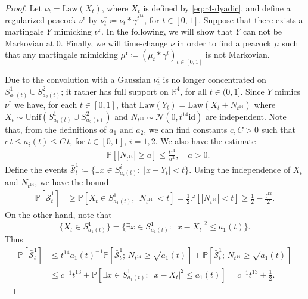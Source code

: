\documentclass[12pt,oneside]{amsart}
\theoremstyle{definition}
\newcommand{\Law}{\mathrm{Law}}
\newcommand{\id}{\mathrm{id}}
\newcommand{\R}{\mathbb R}
\newcommand{\Sccc}{\bar{\mathcal S}}
\newcommand{\reg}{\mathrm{r}}
\def\P{{\mathbb P}}
\def\R{{\mathbb R}}
\numberwithin{equation}{section}
\begin{document}
\begin{proof}
	Let $\nu_t = \Law(X_t)$, where $X_t$ is defined by \eqref{eq:r4-dyadic}, and define a regularized peacock $\nu^\reg$ by $\nu^\reg_t \coloneqq \nu_t \ast \gamma^{t^{14}}$, for $t \in [0, 1]$. Suppose that there exists a martingale $Y$ mimicking $\nu^\reg$. In the following, we will show that $Y$ can not be Markovian at $0$. Finally, we will time-change $\nu$ in order to find a peacock $\mu$ such that any martingale mimicking $\mu^\reg \coloneqq (\mu_t \ast \gamma^t)_{t \in [0, 1]}$ is not Markovian.

	Due to the convolution with a Gaussian $\nu^\reg_t$ is no longer concentrated on $S^1_{a_1(t)} \cup S^2_{a_2(t)}$; it rather has full support on $\R^4$, for all $t \in (0, 1]$. 
    Since $Y$ mimics $\nu^\reg$ we have, for each $t \in [0, 1]$, that $\Law(Y_t) =  \Law( X_t + N_{t^{14}})$ where $X_t \sim \text{Unif}(S^1_{a_1(t)} \cup S^2_{a_2(t)})$ and $N_{t^{14}} \sim \mathcal N(0,t^{14} \id)$ are independent. Note that, from the definitions of $a_1$ and $a_2$, we can find constants $c, C > 0$ such that $c \, t \leq a_i(t) \leq C \, t$, for $t \in [0, 1]$, $i = 1, 2$.
	We also have the estimate
    \begin{equation}
    \begin{split}
        & \P[|N_{t^{14}}| \ge a] \le \frac{t^{14}}{a^2}, \quad a > 0.
	\end{split}
    \end{equation}
	Define the events $\Sccc^1_{t} \coloneqq \{\exists x \in S^i_{a_i(t)} \colon \; |x - Y_t| < t \}$.
	Using the independence of $X_t$ and $N_{t^{14}}$, we have the bound
	\begin{equation}\label{eq:s1-lb}
		\begin{split}
			\P [\Sccc^1_t] & \geq \P[X_t \in S^1_{a_1(t)}, \, |N_{t^{14}}| < t] = \frac 12 \P[|N_{t^{14}}| < t] \geq \frac 12 - \frac{t^{12}}{2}.
		\end{split}
	\end{equation}
	On the other hand, note that
	\begin{equation}
		\{X_t \in S^1_{a_1(t)}\} = \{\exists x \in S^1_{a_1(t)} \colon \; |x - X_t|^2 \leq a_1(t)\}.
	\end{equation}
	Thus
	\begin{equation}\label{eq:s1-ub}
		\begin{split}
			\P [\Sccc^1_t] & \leq t^{14}a_1(t)^{-1} \P [\Sccc^1_t ; \, N_{t^{14}} \geq \sqrt{a_1(t)}] + \P [\Sccc^1_t ; \, N_{t^{14}} \geq \sqrt{a_1(t)}]\\
			& \leq c^{-1}t^{13} + \P[ \exists x \in S^1_{a_1(t)} \colon \; |x - X_t|^2 \leq a_1(t)] = c^{-1}t^{13} + \frac 12.
		\end{split}
	\end{equation}
	

\end{proof}
\end{document}
